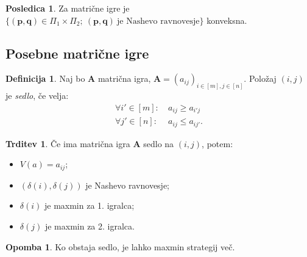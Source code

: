 \documentclass[11pt]{article}
\newcommand{\set}[1]{\{#1\}}
\newcommand{\p}{\mathbf{p}}
\newcommand{\q}{\mathbf{q}}
\renewcommand{\AA}{\mathbf{A}}
\newcommand{\1}{\mathbbm{1}}
\theoremstyle{definition}
\newtheorem{definicija}{Definicija}[section]
\theoremstyle{definition}
\newtheorem{trditev}{Trditev}[section]
\theoremstyle{definition}
\theoremstyle{definition}
\newtheorem*{posledica}{Posledica}
\newtheorem*{opomba}{Opomba}
\begin{document}
\begin{posledica}

Za matrične igre je $\set{(\p,\q)\in\Pi_1\times\Pi_2; ~(\p,\q)~\text{je Nashevo ravnovesje}}$ konveksna.

\end{posledica}
\vspace{0.5cm}


\subsection{Posebne matrične igre}
\vspace{0.5cm}

\begin{definicija}

Naj bo $\AA$ matrična igra, $\AA = (a_{ij})_{i\in [m], j \in [n]}$. Položaj $(i,j)$ je \textit{sedlo}, če velja:
\begin{align*}
\forall i' \in [m]:& ~a_{ij} \geq a_{i'j} \\
\forall j' \in [n]:& ~a_{ij} \leq a_{ij'}.
\end{align*}

\end{definicija}
\vspace{0.5cm}

\begin{trditev}

Če ima matrična igra $\AA$ sedlo na $(i,j)$, potem:
\begin{itemize}
	\item $V(a) = a_{ij}$;
	\item $(\delta(i),\delta(j))$ je Nashevo ravnovesje;
	\item $\delta(i)$ je maxmin za 1. igralca;
	\item $\delta(j)$ je maxmin za 2. igralca.
\end{itemize}

\end{trditev}
\vspace{0.5cm}

\begin{opomba}

Ko obstaja sedlo, je lahko maxmin strategij več.

\end{opomba}
\vspace{0.5cm}

\end{document}
